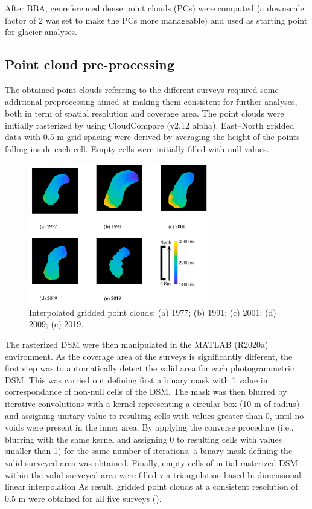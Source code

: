 After BBA, georeferenced dense point clouds (PCs) were computed (a downscale factor of 2 was set to make the PCs more manageable) and used as starting point for glacier analyses. 


\subsection{Point cloud pre-processing}{\label{sec:2:pcd_preproc}}
The obtained point clouds referring to the different surveys required some additional preprocessing aimed at making them consistent for further analyses, both in term of spatial resolution and coverage area.
The point clouds were initially rasterized by using CloudCompare (v2.12 alpha).
East–North gridded data with 0.5 m grid spacing were derived by averaging the height of the points falling inside each cell. 
Empty cells were initially filled with null values.

\begin{figure}[ht]
    \centering
    \includegraphics[width=0.7\textwidth]{pcd_rasterized.png}
    \caption{Interpolated gridded point clouds: (a) 1977; (b) 1991; (c) 2001; (d) 2009; (e) 2019.}
    \label{fig:2:pcd_rasterzed}
\end{figure}

The rasterized DSM were then manipulated in the MATLAB (R2020a) environment.
As the coverage area of the surveys is significantly different, the first step was to automatically detect the valid area for each photogrammetric DSM. 
This was carried out defining first a binary mask with 1 value in correspondance of non-null cells of the DSM. 
The mask was then blurred by iterative convolutions with a kernel representing a circular box (10 m of radius) and assigning unitary value to resulting cells with values greater than 0, until no voids were present in the inner area.
By applying the converse procedure (i.e., blurring with the same kernel and assigning 0 to resulting cells with values smaller than 1) for the same number of iterations, a binary mask defining the valid surveyed area was obtained.
Finally, empty cells of initial rasterized DSM within the valid surveyed area were filled via triangulation-based bi-dimensional linear interpolation
As result, gridded point clouds at a consistent resolution of 0.5 m were obtained for all five surveys ().

